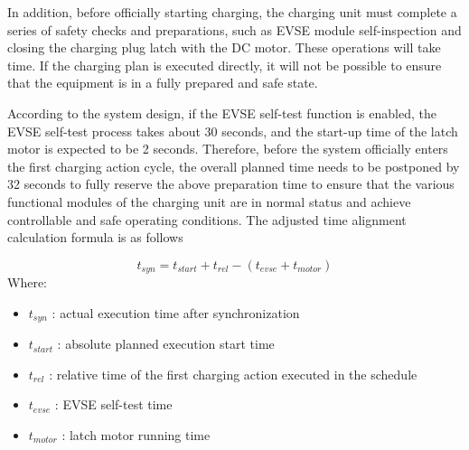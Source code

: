 \documentclass[
	english,
	ruledheaders=section,%
	class=report,%
	thesis={type=Report},%
	accentcolor=9c,%
	custommargins=true,%
	marginpar=false,%
	parskip=half-,%
	fontsize=11pt,%
	logofile={img/tuda_logo.pdf}, %
]{tudapub}
\begin{document}

In addition, before officially starting charging, the charging unit must complete a series of safety checks and preparations, such as EVSE module self-inspection and closing the charging plug latch with the DC motor. These operations will take time. If the charging plan is executed directly, it will not be possible to ensure that the equipment is in a fully prepared and safe state.


According to the system design, if the EVSE self-test function is enabled, the EVSE self-test process takes about 30 seconds, and the start-up time of the latch motor is expected to be 2 seconds. Therefore, before the system officially enters the first charging action cycle, the overall planned time needs to be postponed by 32 seconds to fully reserve the above preparation time to ensure that the various functional modules of the charging unit are in normal status and achieve controllable and safe operating conditions. The adjusted time alignment calculation formula is as follows

\begin{equation} 
    \label{eq:timeSynchronize} 
        t_{syn} = t_{start} + t_{rel} - ( t_{evse} + t_{motor} )
\end{equation}
Where:

\begin{itemize}
    \item $t_{syn}$ : actual execution time after synchronization
    \item $t_{start}$ : absolute planned execution start time
    \item $t_{rel}$ : relative time of the first charging action executed in the schedule
    \item $t_{evse}$ : EVSE self-test time
    \item $t_{motor}$ : latch motor running time
\end{itemize}
\end{document}
